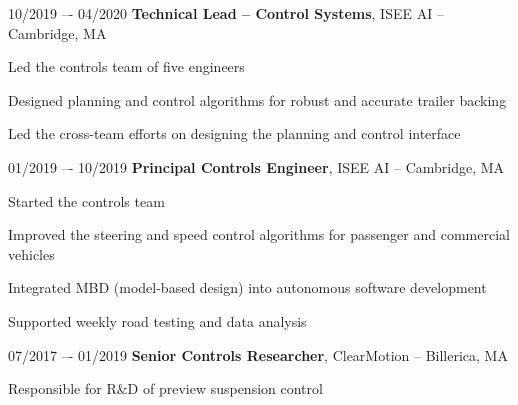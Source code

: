 \begin{twocolentry}{10/2019 –- 04/2020}
\textbf{Technical Lead – Control Systems}, ISEE AI -- Cambridge, MA\end{twocolentry}
\vspace{0.10 cm}
\begin{onecolentry}
\begin{highlights}
\item Led the controls team of five engineers
\item Designed planning and control algorithms for robust and accurate trailer backing
\item Led the cross-team efforts on designing the planning and control interface
\end{highlights}
\end{onecolentry}
\vspace{0.25 cm}

\begin{twocolentry}{01/2019 –- 10/2019}
\textbf{Principal Controls Engineer}, ISEE AI -- Cambridge, MA\end{twocolentry}
\vspace{0.10 cm}
\begin{onecolentry}
\begin{highlights}
\item Started the controls team
\item Improved the steering and speed control algorithms for passenger and commercial vehicles
\item Integrated MBD (model-based design) into autonomous software development
\item Supported weekly road testing and data analysis
\end{highlights}
\end{onecolentry}
\vspace{0.25 cm}


\begin{twocolentry}{07/2017 –- 01/2019}
\textbf{Senior Controls Researcher}, ClearMotion -- Billerica, MA\end{twocolentry}
\vspace{0.10 cm}
\begin{onecolentry}
\begin{highlights}
\item Responsible for R\&D of preview suspension control
\end{highlights}
\end{onecolentry}
\vspace{0.25 cm}


